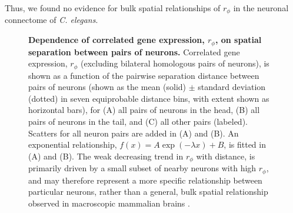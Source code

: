 \documentclass[10pt,letterpaper]{article}
\begin{document}
Thus, we found no evidence for bulk spatial relationships of $r_\phi$ in the neuronal connectome of \emph{C. elegans}.

\begin{figure}[h]
  \centering
  \caption{
  \textbf{Dependence of correlated gene expression, $r_\phi$, on spatial separation between pairs of neurons.}
  Correlated gene expression, $r_\phi$ (excluding bilateral homologous pairs of neurons), is shown as a function of the pairwise separation distance between pairs of neurons (shown as the mean (solid) $\pm$ standard deviation (dotted) in seven equiprobable distance bins, with extent shown as horizontal bars), for (A) all pairs of neurons in the head, (B) all pairs of neurons in the tail, and (C) all other pairs (labeled).
  Scatters for all neuron pairs are added in (A) and (B).
  An exponential relationship, $f(x) = A\exp(-\lambda x) + B$, is fitted in (A) and (B).
  The weak decreasing trend in $r_\phi$ with distance, is primarily driven by a small subset of nearby neurons with high $r_\phi$, and may therefore represent a more specific relationship between particular neurons, rather than a general, bulk spatial relationship observed in macroscopic mammalian brains \cite{Fulcher:2016ck, Krienen:2016eq}.
\label{fig:Fig4}
  }
\end{figure}
\end{document}
